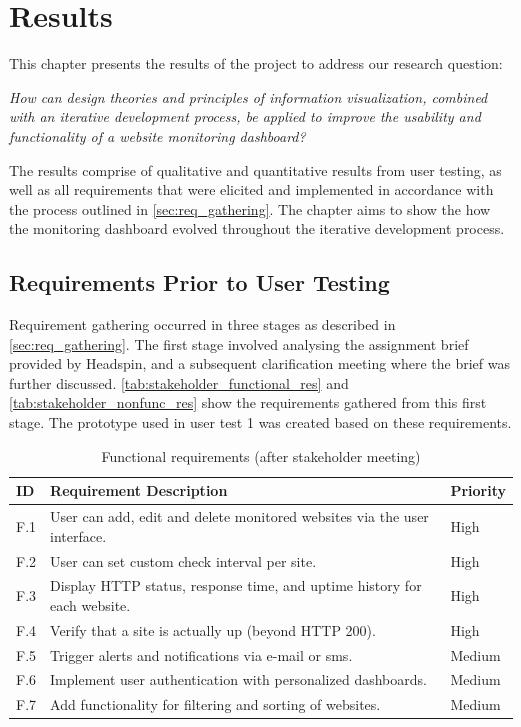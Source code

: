 \chapter{Results}
\label{ch:results}

This chapter presents the results of the project to address our research question:
\begin{mainbox}{} 
      \textit{How can design theories and principles of information visualization, combined with an iterative development process, be applied to improve the usability and functionality of a website monitoring dashboard? }
\end{mainbox}
The results comprise of qualitative and quantitative results from user testing, as well as all requirements that were elicited and implemented in accordance with the process outlined in \autoref{sec:req_gathering}. The chapter aims to show the how the monitoring dashboard evolved throughout the iterative development process.

\section{Requirements Prior to User Testing}
Requirement gathering occurred in three stages as described in \autoref{sec:req_gathering}. The first stage involved analysing the assignment brief provided by Headspin, and a subsequent clarification meeting where the brief was further discussed. \autoref{tab:stakeholder_functional_res} and \autoref{tab:stakeholder_nonfunc_res} show the requirements gathered from this first stage. The prototype used in user test 1 was created based on these requirements.

\begin{table}[H]
\centering
\begin{tabular}{| l  |p{}  |l |} 
\hline
\textbf{ID} & \textbf{Requirement Description}& \textbf{Priority} \\ \hline
F.1 & User can add, edit and delete monitored websites via the user interface.& High \\ \hline
F.2 & User can set custom check interval per site.& High \\ \hline
F.3 & Display HTTP status, response time, and uptime history for each website.& High \\ \hline
F.4 & Verify that a site is actually up (beyond HTTP 200). & High \\ \hline 
F.5 & Trigger alerts and notifications via e-mail or sms.&Medium \\ \hline
F.6 & Implement user authentication with personalized dashboards.& Medium\\ \hline
F.7 & Add functionality for filtering and sorting of websites.& Medium \\ \hline
\end{tabular}
\caption{Functional requirements (after stakeholder meeting)}
\label{tab:stakeholder_functional_res}
\end{table}

